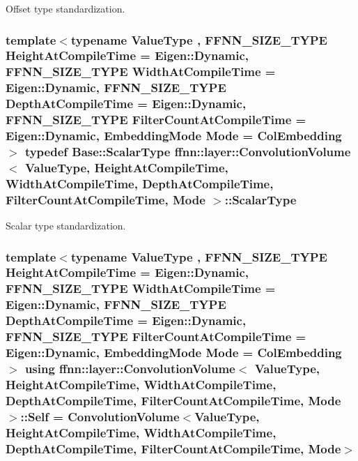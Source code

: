 Offset type standardization. 

\hypertarget{classffnn_1_1layer_1_1_convolution_volume_aee5896ca6c930a673234c66446753432}{
\subsubsection[{Scalar\-Type}]{\setlength{\rightskip}{0pt plus 5cm}template$<$typename Value\-Type , F\-F\-N\-N\-\_\-\-S\-I\-Z\-E\-\_\-\-T\-Y\-P\-E Height\-At\-Compile\-Time = Eigen\-::\-Dynamic, F\-F\-N\-N\-\_\-\-S\-I\-Z\-E\-\_\-\-T\-Y\-P\-E Width\-At\-Compile\-Time = Eigen\-::\-Dynamic, F\-F\-N\-N\-\_\-\-S\-I\-Z\-E\-\_\-\-T\-Y\-P\-E Depth\-At\-Compile\-Time = Eigen\-::\-Dynamic, F\-F\-N\-N\-\_\-\-S\-I\-Z\-E\-\_\-\-T\-Y\-P\-E Filter\-Count\-At\-Compile\-Time = Eigen\-::\-Dynamic, Embedding\-Mode Mode = Col\-Embedding$>$ typedef {\bf Base\-::\-Scalar\-Type} {\bf ffnn\-::layer\-::\-Convolution\-Volume}$<$ Value\-Type, Height\-At\-Compile\-Time, Width\-At\-Compile\-Time, Depth\-At\-Compile\-Time, Filter\-Count\-At\-Compile\-Time, Mode $>$\-::{\bf Scalar\-Type}}}\label{classffnn_1_1layer_1_1_convolution_volume_aee5896ca6c930a673234c66446753432}


Scalar type standardization. 

\hypertarget{classffnn_1_1layer_1_1_convolution_volume_a176ff3362c3ce073b92f837b65cde684}{
\subsubsection[{Self}]{\setlength{\rightskip}{0pt plus 5cm}template$<$typename Value\-Type , F\-F\-N\-N\-\_\-\-S\-I\-Z\-E\-\_\-\-T\-Y\-P\-E Height\-At\-Compile\-Time = Eigen\-::\-Dynamic, F\-F\-N\-N\-\_\-\-S\-I\-Z\-E\-\_\-\-T\-Y\-P\-E Width\-At\-Compile\-Time = Eigen\-::\-Dynamic, F\-F\-N\-N\-\_\-\-S\-I\-Z\-E\-\_\-\-T\-Y\-P\-E Depth\-At\-Compile\-Time = Eigen\-::\-Dynamic, F\-F\-N\-N\-\_\-\-S\-I\-Z\-E\-\_\-\-T\-Y\-P\-E Filter\-Count\-At\-Compile\-Time = Eigen\-::\-Dynamic, Embedding\-Mode Mode = Col\-Embedding$>$ using {\bf ffnn\-::layer\-::\-Convolution\-Volume}$<$ Value\-Type, Height\-At\-Compile\-Time, Width\-At\-Compile\-Time, Depth\-At\-Compile\-Time, Filter\-Count\-At\-Compile\-Time, Mode $>$\-::{\bf Self} =  {\bf Convolution\-Volume}$<$Value\-Type, Height\-At\-Compile\-Time, Width\-At\-Compile\-Time, Depth\-At\-Compile\-Time, Filter\-Count\-At\-Compile\-Time, Mode$>$}}\label{classffnn_1_1layer_1_1_convolution_volume_a176ff3362c3ce073b92f837b65cde684}


